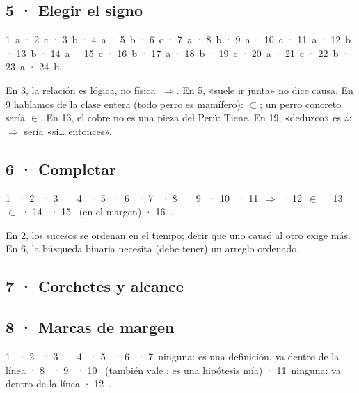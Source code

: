 \documentclass[11pt,a4paper]{article}
\begin{document}
\subsection*{5 · Elegir el signo}
{\small
1~a · 2~c · 3~b · 4~a · 5~b · 6~c · 7~a · 8~b · 9~a · 10~c · 11~a · 12~b ·
13~b · 14~a · 15~c · 16~b · 17~a · 18~b · 19~c · 20~a · 21~c · 22~b · 23~a · 24~b.\par
En 3, la relación es lógica, no física: \(\Rightarrow\). En 5, «suele ir junta» no
dice causa. En 9 hablamos de la clase entera (todo perro es mamífero): \(\subset\);
un perro concreto sería \(\in\). En 13, el cobre no es una pieza del Perú: Tiene.
En 19, «deduzco» es \(\therefore\); \(\Rightarrow\) sería «si\ldots{} entonces».}

\subsection*{6 · Completar}
{\small
1~ · 2~ · 3~ · 4~ · 5~ · 6~ ·
7~ · 8~ · 9~ · 10~ · 11~\(\Rightarrow\) · 12~\(\in\) ·
13~\(\subset\) · 14~ · 15~ (en el margen) · 16~.\par
En 2, los sucesos se ordenan en el tiempo; decir que uno causó al otro exige más.
En 6, la búsqueda binaria necesita (debe tener) un arreglo ordenado.}

\subsection*{7 · Corchetes y alcance}
\begin{apunte}
\end{apunte}

\subsection*{8 · Marcas de margen}
{\small
1~ · 2~ · 3~ · 4~ · 5~ · 6~ ·
7~ninguna: es una definición,  va dentro de la línea · 8~ ·
9~ · 10~ (también vale : es una hipótesis mía) ·
11~ninguna:  va dentro de la línea · 12~.}
\end{document}
